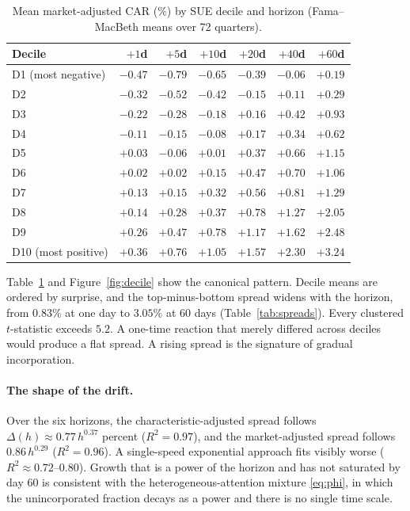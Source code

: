 \documentclass[11pt]{article}
\theoremstyle{definition}
\newcommand{\1}{\mathbf{1}}
\begin{document}
\begin{table}[t]\centering\small
\caption{Mean market-adjusted CAR (\%) by SUE decile and horizon (Fama--MacBeth means over 72 quarters).}\label{tab:deciles}
\begin{tabular}{lrrrrrr}
\toprule
Decile & $+1$d & $+5$d & $+10$d & $+20$d & $+40$d & $+60$d \\
\midrule
D1 (most negative) & $-0.47$ & $-0.79$ & $-0.65$ & $-0.39$ & $-0.06$ & $+0.19$ \\
D2 & $-0.32$ & $-0.52$ & $-0.42$ & $-0.15$ & $+0.11$ & $+0.29$ \\
D3 & $-0.22$ & $-0.28$ & $-0.18$ & $+0.16$ & $+0.42$ & $+0.93$ \\
D4 & $-0.11$ & $-0.15$ & $-0.08$ & $+0.17$ & $+0.34$ & $+0.62$ \\
D5 & $+0.03$ & $-0.06$ & $+0.01$ & $+0.37$ & $+0.66$ & $+1.15$ \\
D6 & $+0.02$ & $+0.02$ & $+0.15$ & $+0.47$ & $+0.70$ & $+1.06$ \\
D7 & $+0.13$ & $+0.15$ & $+0.32$ & $+0.56$ & $+0.81$ & $+1.29$ \\
D8 & $+0.14$ & $+0.28$ & $+0.37$ & $+0.78$ & $+1.27$ & $+2.05$ \\
D9 & $+0.26$ & $+0.47$ & $+0.78$ & $+1.17$ & $+1.62$ & $+2.48$ \\
D10 (most positive) & $+0.36$ & $+0.76$ & $+1.05$ & $+1.57$ & $+2.30$ & $+3.24$ \\
\bottomrule
\end{tabular}
\end{table}

Table~\ref{tab:deciles} and Figure~\ref{fig:decile} show the canonical pattern. Decile means
are ordered by surprise, and the top-minus-bottom spread widens with the horizon, from $0.83\%$
at one day to $3.05\%$ at 60 days (Table~\ref{tab:spreads}). Every clustered $t$-statistic
exceeds $5.2$. A one-time reaction that merely differed across deciles would produce a flat
spread. A rising spread is the signature of gradual incorporation.

\paragraph{The shape of the drift.}
Over the six horizons, the characteristic-adjusted spread follows
$\Delta(h)\approx0.77\,h^{0.37}$ percent ($R^2=0.97$), and the market-adjusted spread follows
$0.86\,h^{0.29}$ ($R^2=0.96$). A single-speed exponential approach fits visibly worse
($R^2\approx0.72$--$0.80$). Growth that is a power of the horizon and has not saturated by day 60
is consistent with the heterogeneous-attention mixture \eqref{eq:phi}, in which the
unincorporated fraction decays as a power and there is no single time scale.
\end{document}
